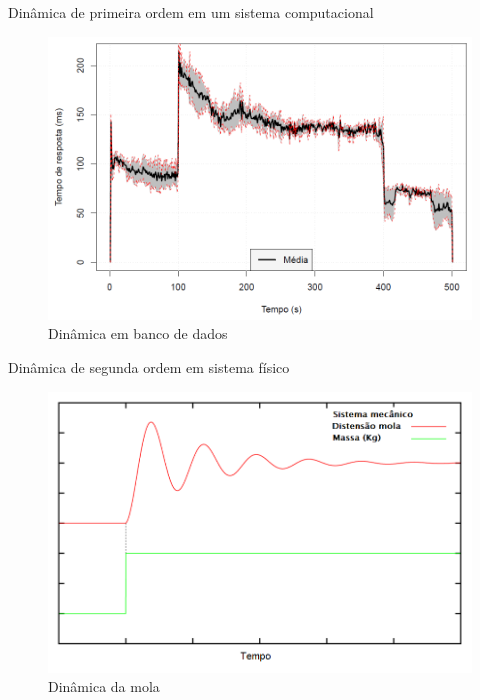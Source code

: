 \begin{frame}{Dinâmica de primeira ordem em um sistema computacional}
	\begin{figure}[htb]
		\centering
		\includegraphics[scale=0.4]{images/tempo-resposta-db2-crop.png}	
		\caption{Dinâmica em banco de dados \cite{Edwin2015}}
	\end{figure}
\end{frame}

\begin{frame}{Dinâmica de segunda ordem em sistema físico}
	\begin{figure}[htb]
		\centering
		\includegraphics[scale=0.4]{../monograph/images/grafico-mola.png}	
		\caption{Dinâmica da mola \cite{Janert2013}}
	\end{figure}
\end{frame}

